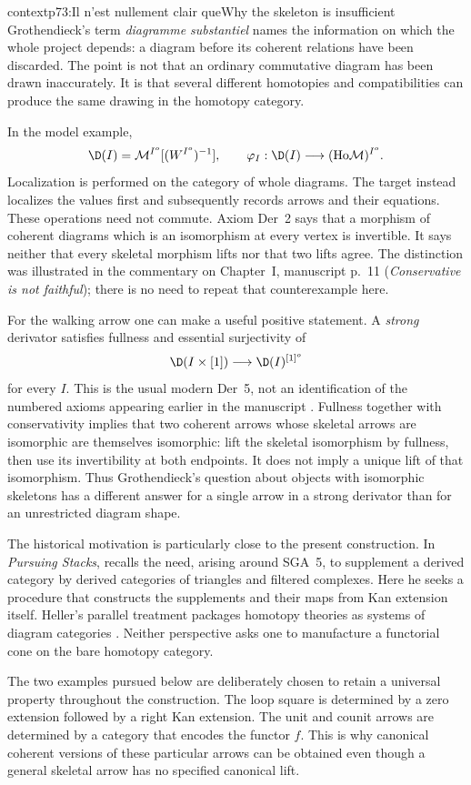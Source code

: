 \begin{dcomment}{context}{p73:Il n'est nullement clair que}{Why the skeleton is insufficient}
Grothendieck's term \emph{diagramme substantiel} names the information on which the whole project depends: a diagram before its coherent relations have been discarded. The point is not that an ordinary commutative diagram has been drawn inaccurately. It is that several different homotopies and compatibilities can produce the same drawing in the homotopy category.

In the model example,
\[
 \D(I)=\mathcal M^{I^o}[(W^{I^o})^{-1}],
 \qquad
 \varphi_I:\D(I)\longrightarrow(\mathrm{Ho}\mathcal M)^{I^o}.
\]
Localization is performed on the category of whole diagrams. The target instead localizes the values first and subsequently records arrows and their equations. These operations need not commute. Axiom Der~2 says that a morphism of coherent diagrams which is an isomorphism at every vertex is invertible. It says neither that every skeletal morphism lifts nor that two lifts agree. The distinction was illustrated in the commentary on Chapter~I, manuscript p.~11 (\emph{Conservative is not faithful}); there is no need to repeat that counterexample here.

For the walking arrow one can make a useful positive statement. A \emph{strong} derivator satisfies fullness and essential surjectivity of
\[
 \D(I\times[1])\longrightarrow\D(I)^{[1]^o}
\]
for every \(I\). This is the usual modern Der~5, not an identification of the numbered axioms appearing earlier in the manuscript \citep[Definition 1.8]{Groth2013}. Fullness together with conservativity implies that two coherent arrows whose skeletal arrows are isomorphic are themselves isomorphic: lift the skeletal isomorphism by fullness, then use its invertibility at both endpoints. It does not imply a unique lift of that isomorphism. Thus Grothendieck's question about objects with isomorphic skeletons has a different answer for a single arrow in a strong derivator than for an unrestricted diagram shape.

The historical motivation is particularly close to the present construction. In \emph{Pursuing Stacks}, \citet[Section 69, pp.~1--2 of the edited extract]{Grothendieck1983} recalls the need, arising around SGA~5, to supplement a derived category by derived categories of triangles and filtered complexes. Here he seeks a procedure that constructs the supplements and their maps from Kan extension itself. Heller's parallel treatment packages homotopy theories as systems of diagram categories \citep[Introduction and Chapter I]{Heller1988}. Neither perspective asks one to manufacture a functorial cone on the bare homotopy category.

The two examples pursued below are deliberately chosen to retain a universal property throughout the construction. The loop square is determined by a zero extension followed by a right Kan extension. The unit and counit arrows are determined by a category that encodes the functor \(f\). This is why canonical coherent versions of these particular arrows can be obtained even though a general skeletal arrow has no specified canonical lift.
\end{dcomment}

